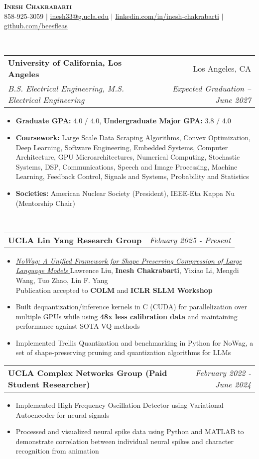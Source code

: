 \documentclass[letterpaper,11pt]{article}
\makeatletter
\newcommand{\resitem}[1]{\item #1 \vspace{-8pt}}
\newcommand{\resheading}[1]{\vspace{8pt}{\Large \textbf{#1}}\\\vspace{-8pt}\hrulefill}
\newcommand{\ressubheading}[4]{\vspace{3pt}
\begin{tabular*}{7.0in}{l@{\cftdotfill{\cftsecdotsep}\extracolsep{\fill}}r}
		\textbf{#1} & #2 \\
		\textit{#3} & \textit{#4} \\
\end{tabular*}\vspace{-6pt}}
\newcommand{\ressubheadingsmol}[2]{\vspace{1pt}
\begin{tabular*}{7.0in}{l@{\cftdotfill{\cftsecdotsep}\extracolsep{\fill}}r}
		\textbf{#1} & \textit{#2} \\
\end{tabular*}\vspace{-6pt}}
\makeatother
\begin{document}
    
\begin{center}
    \textbf{\LARGE \scshape Inesh Chakrabarti} \\ \vspace{1pt}
    \small 858-925-3059 $|$ \href{mailto:inesh33@g.ucla.edu}{\underline{inesh33@g.ucla.edu}} $|$ 
    \href{https://www.linkedin.com/in/inesh-chakrabarti-878602183}{\underline{linkedin.com/in/inesh-chakrabarti}} $|$
    \href{https://github.com/beesfleas}{\underline{github.com/beesfleas}}
\end{center}

\resheading{Education}
\ressubheading{University of California, Los Angeles}{Los Angeles, CA}{B.S. Electrical Engineering, M.S. Electrical Engineering}{Expected Graduation -- June 2027}
\begin{itemize}
	\resitem{\textbf{Graduate GPA:} 4.0 / 4.0, \textbf{Undergraduate Major GPA:} 3.8 / 4.0}
	\resitem{\textbf{Coursework:} Large Scale Data Scraping Algorithms, Convex Optimization, Deep Learning, Software Engineering, Embedded Systems, Computer Architecture, GPU Microarchitectures, Numerical Computing, Stochastic Systems, DSP,  Communications,  Speech and Image Processing, Machine Learning, Feedback Control, Signals and Systems, Probability and Statistics}
    \resitem{\textbf{Societies:} American Nuclear Society (President), IEEE-Eta Kappa Nu (Mentorship Chair)}
\end{itemize}

\resheading{Experience}
\ressubheadingsmol{UCLA Lin Yang Research Group}{Febuary 2025 - Present}{}
\begin{itemize}
  \resitem{\href{https://arxiv.org/abs/2504.14569}{\textit{NoWag: A Unified Framework for Shape Preserving Compression of Large Language Models} 
    } Lawrence Liu, \textbf{Inesh Chakrabarti}, Yixiao Li, Mengdi Wang, Tuo Zhao, Lin F. Yang \\ Publication accepted to \textbf{COLM} and \textbf{ICLR SLLM Workshop}}
    \resitem{Built dequantization/inference kernels in C (CUDA) for parallelization over multiple GPUs while using \textbf{48x less calibration data }and maintaining performance against SOTA VQ methods}
   \resitem{Implemented Trellis Quantization and benchmarking in Python for NoWag, a set of shape-preserving pruning and quantization algorithms for LLMs}
\end{itemize}

\ressubheadingsmol{UCLA Complex Networks Group (Paid Student Researcher)}{February 2022 - June 2024}
\begin{itemize}
    \resitem{Implemented High Frequency Oscillation Detector using Variational Autoencoder for neural signals}
    \resitem{Processed and visualized neural spike data using Python and MATLAB to demonstrate correlation between individual neural spikes and character recognition from animation}

\end{itemize}
\end{document}
